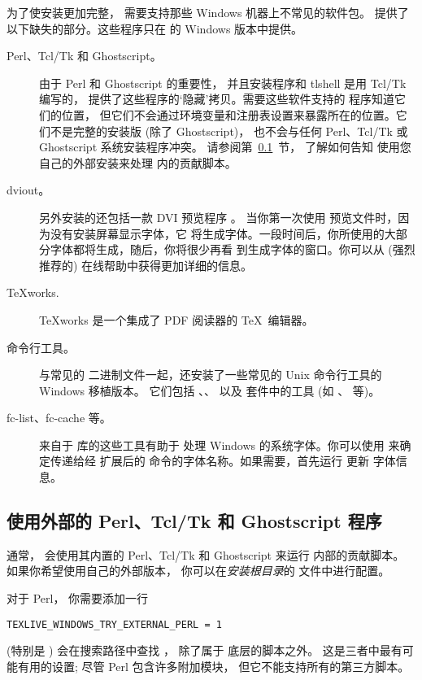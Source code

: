\documentclass{article}
\begin{document}
为了使安装更加完整，\TL{} 需要支持那些 Windows 机器上不常见的软件包。
\TL{} 提供了以下缺失的部分。这些程序只在 \TL{} 的 Windows 版本中提供。

\begin{description}
\item[Perl、Tcl/Tk 和 Ghostscript。] 由于 Perl 和 Ghostscript 的重要性，
并且安装程序和 tlshell \GUI{} 是用 Tcl/Tk 编写的，
\TL{} 提供了这些程序的`隐藏'拷贝。需要这些软件支持的 \TL{} 程序知道它们的位置，
但它们不会通过环境变量和注册表设置来暴露所在的位置。它们不是完整的安装版 (除了 Ghostscript)，
也不会与任何 Perl、Tcl/Tk 或 Ghostscript 系统安装程序冲突。
请参阅第~\ref{sec:externalwndws}~节，
了解如何告知 \TL{} 使用您自己的外部安装来处理 \TL{} 内的贡献脚本。

\item[dviout。] 另外安装的还包括一款 DVI 预览程序 。
当你第一次使用  预览文件时，因为没有安装屏幕显示字体，它
将生成字体。一段时间后，你所使用的大部分字体都将生成，随后，你将很少再看
到生成字体的窗口。你可以从 (强烈推荐的) 在线帮助中获得更加详细的信息。

\item[\TeX{}works.]  \TeX{}works 是一个集成了 PDF 阅读器的
  \TeX\ 编辑器。

\item[命令行工具。] 与常见的 \TL{} 二进制文件一起，还安装了一些常见的
Unix 命令行工具的 Windows 移植版本。
它们包括 、、 以及  套件中的工具
(如 、 等)。

\item[fc-list、fc-cache 等。] 来自于  库的这些工具有助于 \XeTeX{}
处理 Windows 的系统字体。你可以使用  来确定传递给经 \XeTeX
扩展后的  命令的字体名称。如果需要，首先运行  更新
字体信息。
\end{description}

\subsection{使用外部的 Perl、Tcl/Tk 和 Ghostscript 程序}
\label{sec:externalwndws}

通常，
\TL{} 会使用其内置的 Perl、Tcl/Tk 和 Ghostscript 来运行 \TL{} 内部的贡献脚本。
如果你希望使用自己的外部版本，
你可以在\emph{安装根目录}的  文件中进行配置。

对于 Perl，
你需要添加一行
\begin{verbatim}
TEXLIVE_WINDOWS_TRY_EXTERNAL_PERL = 1
\end{verbatim}
\TL{} (特别是 ) 会在搜索路径中查找 ，
除了属于 \TL{} 底层的脚本之外。
这是三者中最有可能有用的设置; 
尽管 \TL{} Perl 包含许多附加模块，
但它不能支持所有的第三方脚本。
\end{document}
